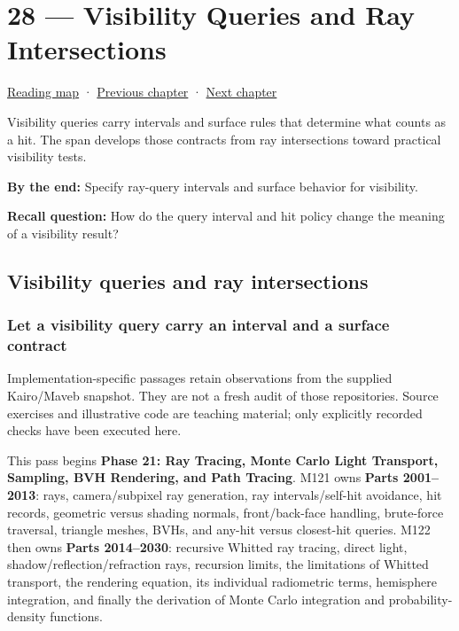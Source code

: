 \hypertarget{04-visual-computing-ii-ch028}{}
\section{28 --- Visibility Queries and Ray Intersections}\label{visibility-queries-and-ray-intersections}

\href{Chapter\%20Edition/02\%20-\%20Graphics\%20Vision\%20and\%20XR/00\%20-\%20Reading\%20Map}{Reading map} · \hyperref[04-visual-computing-ii-ch027]{Previous chapter} · \hyperref[04-visual-computing-ii-ch029]{Next chapter}

Visibility queries carry intervals and surface rules that determine what counts as a hit. The span develops those contracts from ray intersections toward practical visibility tests.

\textbf{By the end:} Specify ray-query intervals and surface behavior for visibility.

\textbf{Recall question:} How do the query interval and hit policy change the meaning of a visibility result?

\subsection{Visibility queries and ray intersections}\label{visibility-queries-and-ray-intersections-1}

\subsubsection{Let a visibility query carry an interval and a surface contract}\label{let-a-visibility-query-carry-an-interval-and-a-surface-contract}

Implementation-specific passages retain observations from the supplied Kairo/Maveb snapshot. They are not a fresh audit of those repositories. Source exercises and illustrative code are teaching material; only explicitly recorded checks have been executed here.

This pass begins \textbf{Phase 21: Ray Tracing, Monte Carlo Light Transport, Sampling, BVH Rendering, and Path Tracing}. M121 owns \textbf{Parts 2001--2013}: rays, camera/subpixel ray generation, ray intervals/self-hit avoidance, hit records, geometric versus shading normals, front/back-face handling, brute-force traversal, triangle meshes, BVHs, and any-hit versus closest-hit queries. M122 then owns \textbf{Parts 2014--2030}: recursive Whitted ray tracing, direct light, shadow/reflection/refraction rays, recursion limits, the limitations of Whitted transport, the rendering equation, its individual radiometric terms, hemisphere integration, and finally the derivation of Monte Carlo integration and probability-density functions.

